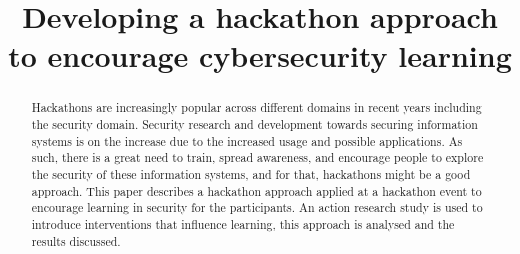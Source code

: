 \documentclass[runningheads]{llncs}
\begin{document}
%
\title{Developing a hackathon approach to encourage cybersecurity learning}
%
%

%
\authorrunning{}
%
\maketitle              %
%
\begin{abstract}
Hackathons are increasingly popular across different domains in recent years including the security domain. Security research and development towards securing information systems%
is on the increase due to the increased usage and possible applications. As such, there is a great need to train, spread awareness, and encourage people to explore the security of these information systems, and for that, hackathons might be a good approach.  This paper describes a hackathon approach applied at a hackathon event to encourage learning
in security for the participants. An action research study is used to introduce interventions that influence learning, this approach is analysed and the results discussed.
\end{abstract}
%
%
%
\end{document}

